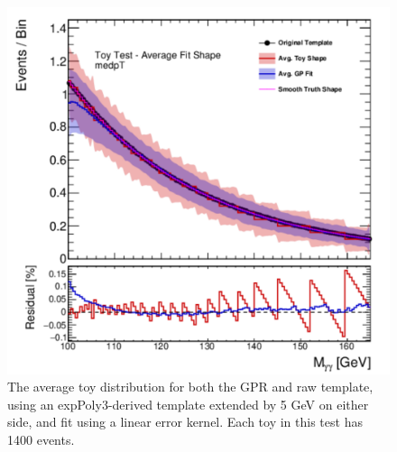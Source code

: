 \begin{figure} 
\begin{center}
  \includegraphics[width=\textwidth]{figures/background/gpr/validation/linear/ToyTest_AvgFitShape_medpT_1400_noSig}   
\caption{The average toy distribution for both the GPR and raw template, using an expPoly3-derived template extended by 5 GeV on either side, and fit using a linear error kernel. Each toy in this test has 1400 events.}
\label{fig:linearkernel_medpt_1400_noSig}
\end{center}
\end{figure}

